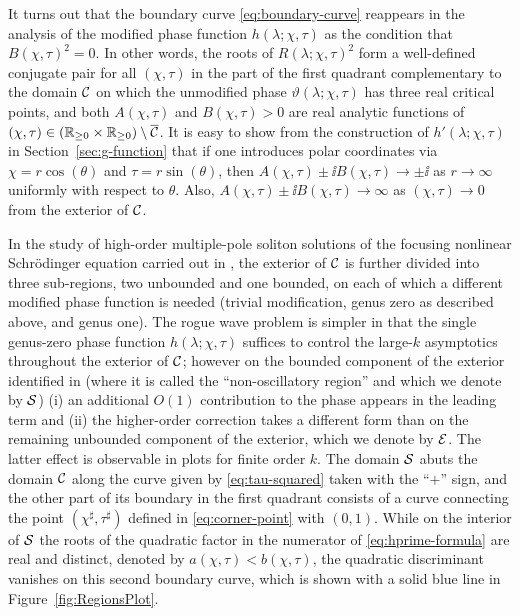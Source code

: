 It turns out that the boundary curve \eqref{eq:boundary-curve} reappears in the analysis of the modified phase function $h(\lambda;\chi,\tau)$ as the condition that $B(\chi,\tau)^2=0$.  
In other words,
the roots of $R(\lambda;\chi,\tau)^2$ form a well-defined conjugate pair for all $(\chi,\tau)$ in the part of the first quadrant complementary to the domain $\mathcal{C}$ on which the unmodified phase $\vartheta(\lambda;\chi,\tau)$ has three real critical points, and both $A(\chi,\tau)$ and $B(\chi,\tau)>0$ are real analytic functions of $(\chi,\tau)\in (\mathbb{R}_{\ge 0}\times\mathbb{R}_{\ge 0})\setminus\overline{\mathcal{C}}$.  It is easy to show from the construction of $h'(\lambda;\chi,\tau)$ in Section~\ref{sec:g-function} that if one introduces polar coordinates via $\chi=r\cos(\theta)$ and $\tau=r\sin(\theta)$, then $A(\chi,\tau)\pm\ii B(\chi,\tau)\to\pm\ii$ as $r\to\infty$ uniformly with respect to $\theta$.  Also, $A(\chi,\tau)\pm\ii B(\chi,\tau)\to\infty$ as $(\chi,\tau)\to 0$ from the exterior of $\mathcal{C}$.

In the study of high-order multiple-pole soliton solutions of the focusing nonlinear Schr\"odinger equation carried out in \cite{BilmanBW19}, the exterior of $\mathcal{C}$ is further divided into three sub-regions, two unbounded and one bounded, on each of which a different modified phase function is needed (trivial modification, genus zero as described above, and genus one).  The rogue wave problem is simpler in that the single genus-zero phase function $h(\lambda;\chi,\tau)$ suffices to control the large-$k$ asymptotics throughout the exterior of $\mathcal{C}$; however on the bounded component of the exterior identified in \cite{BilmanBW19} (where it is called the ``non-oscillatory region'' and which we denote by $\mathcal{S}$) (i) an additional $O(1)$ contribution to the phase appears in the leading term and (ii) the higher-order correction takes a different form than on the remaining unbounded component of the exterior, which we denote by $\mathcal{E}$.  The latter effect is observable in plots for finite order $k$.  The domain $\mathcal{S}$ abuts the domain $\mathcal{C}$ along
the curve given by \eqref{eq:tau-squared} taken with the ``$+$'' sign, and the other part of its boundary in the first quadrant consists of a curve connecting the point $(\chi^\sharp,\tau^\sharp)$ defined in \eqref{eq:corner-point} with $(0,1)$.  While on the interior of $\mathcal{S}$ the roots of the quadratic factor in the numerator of \eqref{eq:hprime-formula} are real and distinct, denoted by $a(\chi,\tau)<b(\chi,\tau)$, the quadratic discriminant vanishes on this second boundary curve, which is shown with a solid blue line in Figure~\ref{fig:RegionsPlot}.



